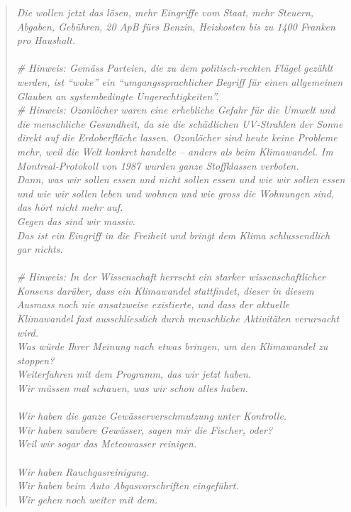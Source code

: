 \documentclass[a4paper,11pt]{report}
\newenvironment{itquote}
	{\begin{quote}\itshape}
	{\end{quote}\ignorespacesafterend}
\begin{document}
\begin{itquote}
				Die wollen jetzt das lösen, mehr Eingriffe vom Staat, mehr Steuern, Abgaben, Gebühren, 20 ApB fürs Benzin, Heizkosten bis zu 1400 Franken pro Haushalt.\\
				\\
				  \# Hinweis: Gemäss Parteien, die zu dem politisch-rechten Flügel gezählt werden, ist ``woke'' ein ``umgangssprachlicher Begriff für einen allgemeinen Glauben an systembedingte Ungerechtigkeiten''.\\
				  \# Hinweis: Ozonlöcher waren eine erhebliche Gefahr für die Umwelt und die menschliche Gesundheit, da sie die schädlichen UV-Strahlen der Sonne direkt auf die Erdoberfläche lassen. Ozonlöcher sind heute keine Probleme mehr, weil die Welt konkret handelte – anders als beim Klimawandel. Im Montreal-Protokoll von 1987 wurden ganze Stoffklassen verboten.\\
				Dann, was wir sollen essen und nicht sollen essen und wie wir sollen essen und wie wir sollen leben und wohnen und wie gross die Wohnungen sind, das hört nicht mehr auf.\\
				Gegen das sind wir massiv.\\
				Das ist ein Eingriff in die Freiheit und bringt dem Klima schlussendlich gar nichts.\\
				\\
				  \# Hinweis: In der Wissenschaft herrscht ein starker wissenschaftlicher Konsens darüber, dass ein Klimawandel stattfindet, dieser in diesem Ausmass noch nie ansatzweise existierte, und dass der aktuelle Klimawandel fast ausschliesslich durch menschliche Aktivitäten verursacht wird.\\
				Was würde Ihrer Meinung nach etwas bringen, um den Klimawandel zu stoppen?\\
				Weiterfahren mit dem Programm, das wir jetzt haben.\\
				Wir müssen mal schauen, was wir schon alles haben.\\
				\\
				Wir haben die ganze Gewässerverschmutzung unter Kontrolle.\\
				Wir haben saubere Gewässer, sagen mir die Fischer, oder?\\
				Weil wir sogar das Meteowasser reinigen.\\
				\\
				Wir haben Rauchgasreinigung.\\
				Wir haben beim Auto Abgasvorschriften eingeführt.\\
				Wir gehen noch weiter mit dem.\\

\end{itquote}
\end{document}
